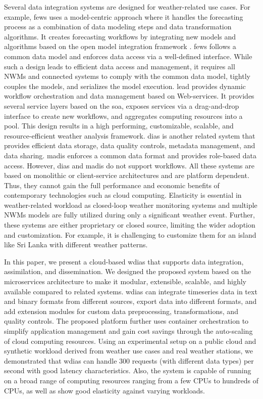 \documentclass[conference]{IEEEtran}
\begin{document}
Several data integration systems are designed for weather-related use cases. For example, \acrshort{fews} \cite{Werner2013TheSystem} uses a model-centric approach where it handles the forecasting process as a combination of data modeling steps and data transformation algorithms. It creates forecasting workflows by integrating new models and algorithms based on the open model integration framework \cite{Kokkonen2003InterfacingXML}. \acrshort{fews} follows a common data model and enforces data access via a well-defined interface. While such a design leads to efficient data access and management, it requires all NWMs and connected systems to comply with the common data model, tightly couples the models, and serializes the model execution. 
\acrfull{lead} \cite{Droegemeier2005Service-OrientedWeather} provides dynamic workflow orchestration and data management based on Web-services. It provides several service layers based on the \acrfull{soa}, exposes services via a drag-and-drop interface to create new workflows, and aggregates computing resources into a pool. This design results in a high performing, customizable, scalable, and resource-efficient weather analysis framework. 
\acrfull{dias} \cite{Kawasaki2018DataReduction} is another related system that provides efficient data storage, data quality controls, metadata management, and data sharing. \acrfull{madis} \cite{Macdermaid2005ArchitectureP2.39} enforces a common data format and provides role-based data access. 
However, \acrshort{dias} and \acrshort{madis} do not support workflows. All these systems are based on monolithic or client-service architectures and are platform dependent. Thus, they cannot gain the full performance and economic benefits of contemporary technologies such as cloud computing. Elasticity is essential in weather-related workload as closed-loop weather monitoring systems and multiple NWMs models are fully utilized during only a significant weather event. Further, these systems are either proprietary or closed source, limiting the wider adoption and customization. For example, it is challenging to customize them for an island like Sri Lanka with different weather patterns.

In this paper, we present a cloud-based \acrfull{wdias} that supports data integration, assimilation, and dissemination. We designed the proposed system based on the microservices architecture to make it modular, extensible, scalable, and highly available compared to related systems. \acrshort{wdias} can integrate timeseries data in text and binary formats from different sources, export data into different formats, and add extension modules for custom data preprocessing, transformations, and quality controls. The proposed platform further uses container orchestration to simplify application management and gain cost savings through the auto-scaling of cloud computing resources. 
Using an experimental setup on a public cloud and synthetic workload derived from weather use cases and real weather stations, we demonstrated that \acrshort{wdias} can handle 300 requests (with different data types) per second with good latency characteristics. Also, the system is capable of running on a broad range of computing resources ranging from a few CPUs to hundreds of CPUs, as well as show good elasticity against varying workloads.
\end{document}
